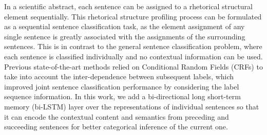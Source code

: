 \documentclass[11pt,a4paper]{article}
\begin{document}
In a scientific abstract, each sentence can be assigned to a rhetorical structural element sequentially. This rhetorical structure profiling process can be formulated as a sequential sentence classification task, as the element assignment of any single sentence is greatly associated with the assignments of the surrounding sentences. This is in contrast to the general sentence classification problem, where each sentence is classified individually and no contextual information can be used. Previous state-of-the-art methods relied on Conditional Random Fields (CRFs) to take into account the inter-dependence between subsequent labels, which improved joint sentence classification performance by considering the label sequence information. In this work, we add a bi-directional long short-term memory (bi-LSTM) layer over the representations of individual sentences so that it can encode the contextual content and semantics from preceding and succeeding sentences for better categorical inference of the current one.
\end{document}
